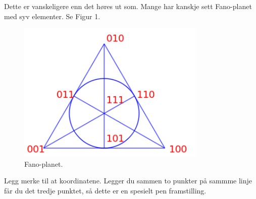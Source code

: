 \documentclass[11pt, norsk]{article}
\begin{document}
\begin{losn}
Dette er vanskeligere enn det høres ut som. Mange har kanskje sett Fano-planet med syv elementer. Se Figur 1.
\begin{figure}
 \centering
\includegraphics[width=90mm]{fanoplane}
  \caption{Fano-planet.}
\end{figure}  
Legg merke til at koordinatene. Legger du sammen to punkter på sammme linje får du det tredje punktet, så dette er en spesielt pen framstilling.


\end{losn}
\end{document}
